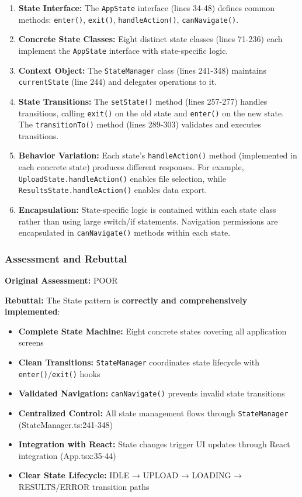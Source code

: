 \documentclass[11pt]{article}
\begin{document}
\begin{enumerate}[noitemsep]
    \item \textbf{State Interface:} The \texttt{AppState} interface (lines 34-48) defines common methods: \texttt{enter()}, \texttt{exit()}, \texttt{handleAction()}, \texttt{canNavigate()}.

    \item \textbf{Concrete State Classes:} Eight distinct state classes (lines 71-236) each implement the \texttt{AppState} interface with state-specific logic.

    \item \textbf{Context Object:} The \texttt{StateManager} class (lines 241-348) maintains \texttt{currentState} (line 244) and delegates operations to it.

    \item \textbf{State Transitions:} The \texttt{setState()} method (lines 257-277) handles transitions, calling \texttt{exit()} on the old state and \texttt{enter()} on the new state. The \texttt{transitionTo()} method (lines 289-303) validates and executes transitions.

    \item \textbf{Behavior Variation:} Each state's \texttt{handleAction()} method (implemented in each concrete state) produces different responses. For example, \texttt{UploadState.handleAction()} enables file selection, while \texttt{ResultsState.handleAction()} enables data export.

    \item \textbf{Encapsulation:} State-specific logic is contained within each state class rather than using large switch/if statements. Navigation permissions are encapsulated in \texttt{canNavigate()} methods within each state.
\end{enumerate}

\subsubsection{Assessment and Rebuttal}
\textbf{Original Assessment:} POOR

\textbf{Rebuttal:} The State pattern is \textbf{correctly and comprehensively implemented}:

\begin{itemize}[noitemsep]
    \item \textbf{Complete State Machine:} Eight concrete states covering all application screens
    \item \textbf{Clean Transitions:} \texttt{StateManager} coordinates state lifecycle with \texttt{enter()}/\texttt{exit()} hooks
    \item \textbf{Validated Navigation:} \texttt{canNavigate()} prevents invalid state transitions
    \item \textbf{Centralized Control:} All state management flows through \texttt{StateManager} (StateManager.ts:241-348)
    \item \textbf{Integration with React:} State changes trigger UI updates through React integration (App.tsx:35-44)
    \item \textbf{Clear State Lifecycle:} IDLE → UPLOAD → LOADING → RESULTS/ERROR transition paths
\end{itemize}
\end{document}
